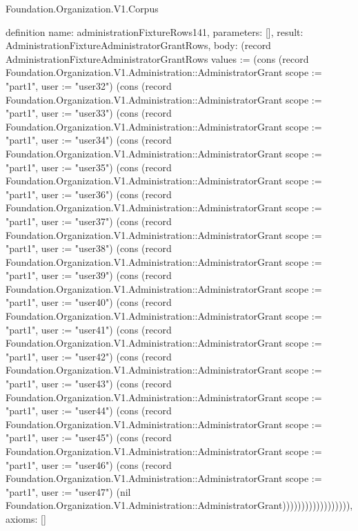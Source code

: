 \begin{lexlean}{Foundation.Organization.V1.Corpus}
\begin{semanticmodule}
definition{
  name: administrationFixtureRows141,
  parameters: [],
  result: AdministrationFixtureAdministratorGrantRows,
  body: (record AdministrationFixtureAdministratorGrantRows {values := (cons (record Foundation.Organization.V1.Administration::AdministratorGrant {scope := "part1", user := "user32"}) (cons (record Foundation.Organization.V1.Administration::AdministratorGrant {scope := "part1", user := "user33"}) (cons (record Foundation.Organization.V1.Administration::AdministratorGrant {scope := "part1", user := "user34"}) (cons (record Foundation.Organization.V1.Administration::AdministratorGrant {scope := "part1", user := "user35"}) (cons (record Foundation.Organization.V1.Administration::AdministratorGrant {scope := "part1", user := "user36"}) (cons (record Foundation.Organization.V1.Administration::AdministratorGrant {scope := "part1", user := "user37"}) (cons (record Foundation.Organization.V1.Administration::AdministratorGrant {scope := "part1", user := "user38"}) (cons (record Foundation.Organization.V1.Administration::AdministratorGrant {scope := "part1", user := "user39"}) (cons (record Foundation.Organization.V1.Administration::AdministratorGrant {scope := "part1", user := "user40"}) (cons (record Foundation.Organization.V1.Administration::AdministratorGrant {scope := "part1", user := "user41"}) (cons (record Foundation.Organization.V1.Administration::AdministratorGrant {scope := "part1", user := "user42"}) (cons (record Foundation.Organization.V1.Administration::AdministratorGrant {scope := "part1", user := "user43"}) (cons (record Foundation.Organization.V1.Administration::AdministratorGrant {scope := "part1", user := "user44"}) (cons (record Foundation.Organization.V1.Administration::AdministratorGrant {scope := "part1", user := "user45"}) (cons (record Foundation.Organization.V1.Administration::AdministratorGrant {scope := "part1", user := "user46"}) (cons (record Foundation.Organization.V1.Administration::AdministratorGrant {scope := "part1", user := "user47"}) (nil Foundation.Organization.V1.Administration::AdministratorGrant)))))))))))))))))}),
  axioms: []
}


\end{semanticmodule}
\end{lexlean}
